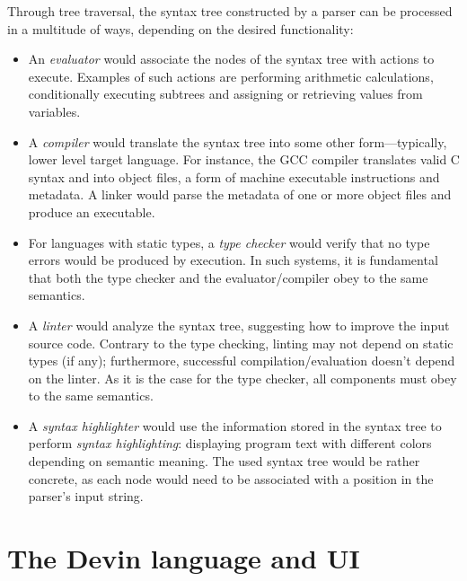 \documentclass[UdineBachThesis,american,11pt]{PhdThesis}
\begin{document}
  Through tree traversal, the syntax tree constructed by a parser can be
  processed in a multitude of ways, depending on the desired functionality:

  \begin{itemize}
    \item An \emph{evaluator} would associate the nodes of the syntax tree with
    actions to execute. Examples of such actions are performing arithmetic
    calculations, conditionally executing subtrees and assigning or retrieving
    values from variables.

    \item A \emph{compiler} would translate the syntax tree into some other
    form---typically, lower level target language. For instance, the GCC
    compiler translates valid C syntax and into object files, a form of machine
    executable instructions and metadata. A linker would parse the metadata of
    one or more object files and produce an executable.

    \item For languages with static types, a \emph{type checker} would verify
    that no type errors would be produced by execution. In such systems, it is
    fundamental that both the type checker and the evaluator/compiler obey to
    the same semantics.

    \item A \emph{linter} would analyze the syntax tree, suggesting how to
    improve the input source code. Contrary to the type checking, linting may
    not depend on static types (if any); furthermore, successful
    compilation/evaluation doesn't depend on the linter. As it is the case for
    the type checker, all components must obey to the same semantics.

    \item A \emph{syntax highlighter} would use the information stored in the
    syntax tree to perform \emph{syntax highlighting}: displaying program text
    with different colors depending on semantic meaning. The used syntax tree
    would be rather concrete, as each node would need to be associated with a
    position in the parser's input string.
  \end{itemize}

  \newpage

  \thispagestyle{empty}

  \chapter{The Devin language and UI}
\end{document}
